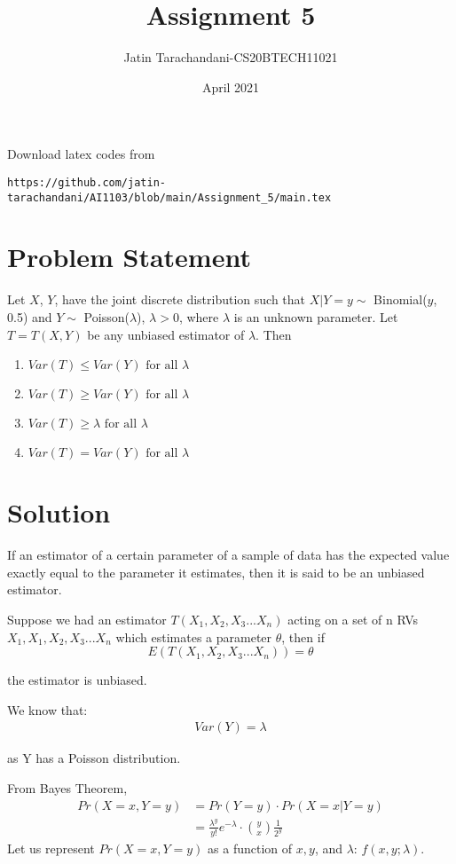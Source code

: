 \documentclass[twocolumn]{article}
\title{Assignment 5}
\author{Jatin Tarachandani-CS20BTECH11021}
\date{April 2021}
\providecommand{\brak}[1]{\ensuremath{\left(#1\right)}}
\theoremstyle{remark}
\numberwithin{equation}{subsection}
\begin{document}
\maketitle
Download latex codes from 
%
\begin{lstlisting}
https://github.com/jatin-tarachandani/AI1103/blob/main/Assignment_5/main.tex
\end{lstlisting}
\section{Problem Statement}
Let $X$, $Y$, have the joint discrete distribution such that $X|Y=y \sim$ Binomial($y$, 0.5) and $Y\sim$ Poisson($\lambda$), $\lambda>0$, where $\lambda$ is an unknown parameter. Let $T=T(X, Y)$ be any unbiased estimator of $\lambda$. Then
\begin{enumerate}
    \item  $Var(T) \leq Var(Y)  \text{ for all } \lambda$
    \item $Var(T) \geq Var(Y) \text{ for all } \lambda$
    \item $Var(T) \geq \lambda \text{ for all } \lambda$
    \item $Var(T) = Var(Y) \text{ for all } \lambda$
\end{enumerate}

\section{Solution}
If an estimator of a certain parameter of a sample of data has the expected value exactly equal to the parameter it estimates, then it is said to be an unbiased estimator. 

Suppose we had an estimator $T(X_1, X_2, X_3...X_n)$ acting on a set of n RVs $X_1, X_1, X_2, X_3...X_n$ which estimates a parameter $\theta$, then if
\begin{equation}
    E\brak{T(X_1, X_2, X_3...X_n)}=\theta
\end{equation}

the estimator is unbiased. 

We know that:
\begin{align}
Var(Y)=\lambda
\end{align}

as Y has a Poisson distribution.

From Bayes Theorem,
\begin{align}
    Pr\brak{X=x,Y=y}&=Pr\brak{Y=y}\cdot Pr\brak{X=x|Y=y}\\
    &=\frac{\lambda^y}{y!} e^{- \lambda}\cdot \binom{y}{x} \frac{1}{2^y}
\end{align}
Let us represent $ Pr\brak{X=x,Y=y}$ as a function of $x, y$, and $\lambda$: $f(x, y;\lambda)$.
\end{document}
